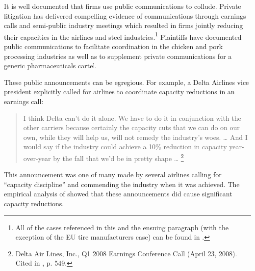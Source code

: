 It is well documented that firms use
public communications to collude. Private litigation has delivered
compelling evidence of communications through earnings calls and semi-public
industry meetings which resulted in firms jointly reducing their capacities
in the airlines and steel industries.\footnote{%
All of the cases referenced in this and the ensuing paragraph (with the
exception of the EU tire manufacturers case) can be found in
\textcite{harrington2022collusion}.} Plaintiffs have documented
public communications to
facilitate coordination in the chicken and pork processing industries as
well as to supplement private communications for a generic pharmaceuticals
cartel.

These public announcements can be egregious. For example, a 
Delta Airlines vice president explicitly called for airlines to
coordinate capacity reductions in an earnings call:

\begin{quotation}
\noindent I think Delta can't do it alone. We have to do it in conjunction with the
other carriers because certainly the capacity cuts that we can do on our
own, while they will help us, will not remedy the industry's woes. \ldots{}
And I would say if the industry could achieve a 10\% reduction in capacity
year-over-year by the fall that we'd be in pretty shape \ldots{} \footnote{%
Delta Air Lines, Inc., Q1 2008 Earnings Conference Call (April 23, 2008).
Cited in \textcite{harrington2022collusion}, p. 549.}
\end{quotation}

\noindent This announcement was one of many made by several airlines calling
for ``capacity discipline'' and commending the industry when it was achieved.
The empirical analysis of \textcite{aryal2022coordinated} showed that these
announcements did cause significant capacity reductions.

